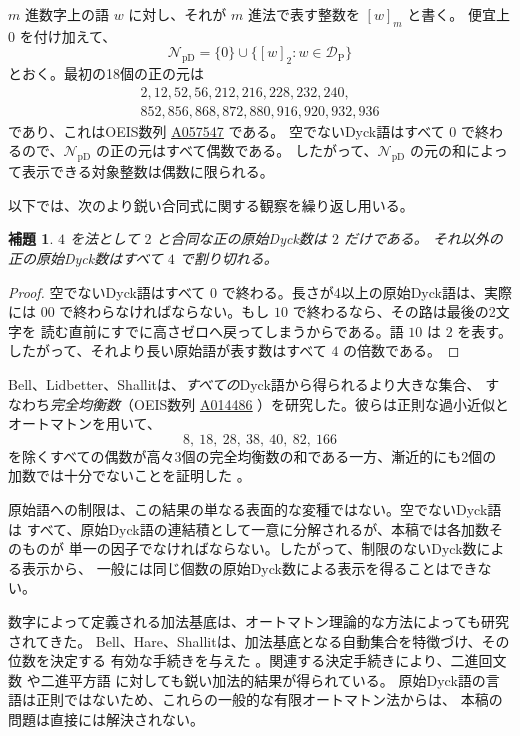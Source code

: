 \documentclass[12pt]{ltjsarticle}
\theoremstyle{plain}
\newtheorem{lemma}[theorem]{補題}
\newcommand{\val}[2]{[#1]_{#2}}
\newcommand{\NpD}{\mathcal{N}_{\mathrm{pD}}}
\newcommand{\DP}{\mathcal{D}_{\mathrm{P}}}
\newcommand{\seqnum}[1]{\href{https://oeis.org/#1}{\rm \underline{#1}}}
\begin{document}
$m$ 進数字上の語 $w$ に対し、それが $m$ 進法で表す整数を $\val{w}{m}$ と書く。
便宜上 $0$ を付け加えて、
\[
 \NpD=\{0\}\cup\{\val{w}{2}:w\in\DP\}
\]
とおく。最初の18個の正の元は
\[
\begin{gathered}
2,12,52,56,212,216,228,232,240,\\
852,856,868,872,880,916,920,932,936
\end{gathered}
\]
であり、これはOEIS数列 \seqnum{A057547} \cite{OEIS-A057547} である。
空でないDyck語はすべて $0$ で終わるので、$\NpD$ の正の元はすべて偶数である。
したがって、$\NpD$ の元の和によって表示できる対象整数は偶数に限られる。

以下では、次のより鋭い合同式に関する観察を繰り返し用いる。

\begin{lemma}\label{lem:mod4}
$4$ を法として $2$ と合同な正の原始Dyck数は $2$ だけである。
それ以外の正の原始Dyck数はすべて $4$ で割り切れる。
\end{lemma}

\begin{proof}
空でないDyck語はすべて $0$ で終わる。長さが4以上の原始Dyck語は、実際には
$00$ で終わらなければならない。もし $10$ で終わるなら、その路は最後の2文字を
読む直前にすでに高さゼロへ戻ってしまうからである。語 $10$ は $2$ を表す。
したがって、それより長い原始語が表す数はすべて $4$ の倍数である。
\end{proof}

Bell、Lidbetter、Shallitは、\emph{すべての}Dyck語から得られるより大きな集合、
すなわち\emph{完全均衡数}（OEIS数列 \seqnum{A014486}
\cite{OEIS-A014486}）を研究した。彼らは正則な過小近似とオートマトンを用いて、
\[
        8,\ 18,\ 28,\ 38,\ 40,\ 82,\ 166
\]
を除くすべての偶数が高々3個の完全均衡数の和である一方、漸近的にも2個の
加数では十分でないことを証明した \cite[Thm.\ 14]{BLS}。

原始語への制限は、この結果の単なる表面的な変種ではない。空でないDyck語は
すべて、原始Dyck語の連結積として一意に分解されるが、本稿では各加数そのものが
単一の因子でなければならない。したがって、制限のないDyck数による表示から、
一般には同じ個数の原始Dyck数による表示を得ることはできない。

数字によって定義される加法基底は、オートマトン理論的な方法によっても研究されてきた。
Bell、Hare、Shallitは、加法基底となる自動集合を特徴づけ、その位数を決定する
有効な手続きを与えた \cite{BHS}。関連する決定手続きにより、二進回文数
\cite{RSS} や二進平方語 \cite{MNRS} に対しても鋭い加法的結果が得られている。
原始Dyck語の言語は正則ではないため、これらの一般的な有限オートマトン法からは、
本稿の問題は直接には解決されない。
\end{document}
